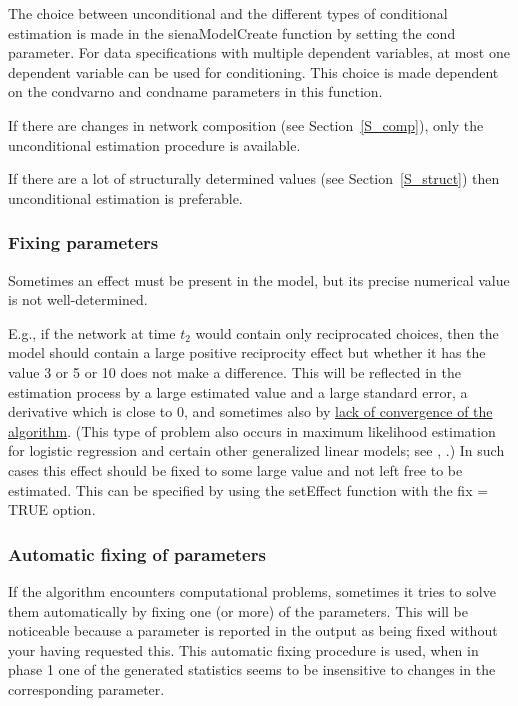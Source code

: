 \documentclass[a4paper,fleqn,11pt]{article}
\newcommand{\+}{\, + \,}
\begin{document}
The choice between
unconditional and the different types of conditional estimation is
made in the \textsf{sienaModelCreate} function by setting the
\textsf{cond} parameter.
For data specifications with multiple dependent variables,
at most one dependent variable can be used for conditioning.
This choice is made dependent on the
\textsf{condvarno} and \textsf{condname} parameters in this function.

If there are changes in network composition (see
Section~\ref{S_comp}), only the unconditional estimation procedure
is available.

If there are a lot of structurally determined values (see Section~\ref{S_struct})
then unconditional estimation is preferable.


\subsubsection{Fixing parameters}
\label{S_fixingparameters}

\hypertarget{T_fix}{Sometimes an effect must be present in the
model, but its precise numerical value is not well-determined.}
E.g., if the network at time $t_2$ would contain only reciprocated
choices, then the model should contain a large positive
reciprocity effect but whether it has the value 3 or 5 or 10 does
not make a difference. This will be reflected in the estimation
process by a large estimated value and a large standard error, a
derivative which is close to 0, and sometimes also by
\hyperlink{T_convergence}{lack of convergence of the algorithm}.
(This type of problem also occurs in maximum likelihood estimation
for logistic regression and certain other generalized linear
models; \label{LargeFix} see \citet[section 1.6]{GeyerThompson92},
\citet{AlbertAnderson84, HauckDonner77}.)
In such cases this effect
should be fixed to some large value and not left free to be
estimated. This can be specified
by using the \textsf{setEffect} function with the
\textsf{fix = TRUE} option.



\subsubsection{Automatic fixing of parameters}
\label{S_fixing}

If the algorithm encounters computational
problems, sometimes it tries to solve them automatically by fixing
one (or more) of the parameters. This will be noticeable because a
parameter is reported in the output as being fixed without your
having requested this. This automatic fixing procedure is used,
when in phase 1 one of the generated statistics seems to be
insensitive to changes in the corresponding parameter.
\end{document}
